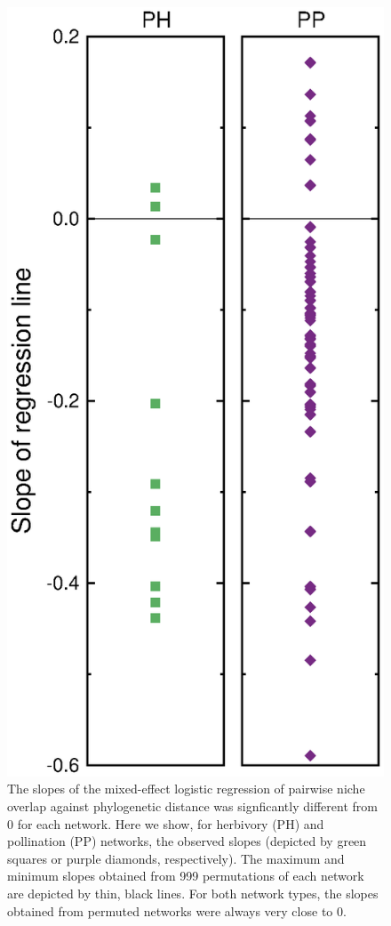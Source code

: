 \documentclass[12pt]{article}
\begin{document}
  \begin{figure}[!h]
    \begin{center}
      \centerline{\includegraphics*[height=.75\textwidth]{Figures/dataplots/observed_vs_random.eps}}
    \end{center}
     \caption{The slopes of the mixed-effect logistic regression of pairwise niche overlap against phylogenetic distance was signficantly different from 0 for each network. Here we show, for herbivory (PH) and pollination (PP) networks, the observed slopes (depicted by green squares or purple diamonds, respectively). The maximum and minimum slopes obtained from 999 permutations of each network are depicted by thin, black lines. For both network types, the slopes obtained from permuted networks were always very close to 0.}
    \label{obs_vs_random} 
  \end{figure}
\end{document}
